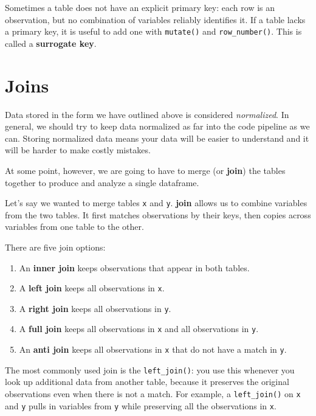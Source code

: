 \documentclass[
]{book}
\providecommand{\tightlist}{%
  \setlength{\itemsep}{0pt}\setlength{\parskip}{0pt}}
\begin{document}
Sometimes a table does not have an explicit primary key: each row is an observation, but no combination of variables reliably identifies it. If a table lacks a primary key, it is useful to add one with \texttt{mutate()} and \texttt{row\_number()}. This is called a \textbf{surrogate key}.

\hypertarget{joins}{%
\section{Joins}\label{joins}}

Data stored in the form we have outlined above is considered \emph{normalized}. In general, we should try to keep data normalized as far into the code pipeline as we can. Storing normalized data means your data will be easier to understand and it will be harder to make costly mistakes.

At some point, however, we are going to have to merge (or \textbf{join}) the tables together to produce and analyze a single dataframe.

Let's say we wanted to merge tables \texttt{x} and \texttt{y}. \textbf{join} allows us to combine variables from the two tables. It first matches observations by their keys, then copies across variables from one table to the other.

There are five join options:

\begin{enumerate}
\def\labelenumi{\arabic{enumi}.}
\tightlist
\item
  An \textbf{inner join} keeps observations that appear in both tables.
\item
  A \textbf{left join} keeps all observations in \texttt{x}.
\item
  A \textbf{right join} keeps all observations in \texttt{y}.
\item
  A \textbf{full join} keeps all observations in \texttt{x} and all observations in \texttt{y}.
\item
  An \textbf{anti join} keeps all observations in \texttt{x} that do not have a match in \texttt{y}.
\end{enumerate}

The most commonly used join is the \texttt{left\_join()}: you use this whenever you look up additional data from another table, because it preserves the original observations even when there is not a match. For example, a \texttt{left\_join()} on \texttt{x} and \texttt{y} pulls in variables from \texttt{y} while preserving all the observations in \texttt{x}.
\end{document}
